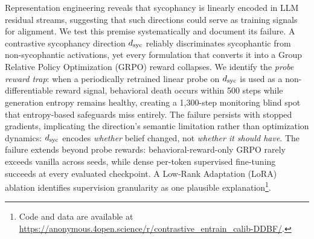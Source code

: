 Representation engineering reveals that sycophancy is linearly encoded in LLM residual streams, suggesting that such directions could serve as training signals for alignment. We test this premise systematically and document its failure. A contrastive sycophancy direction $d_{\text{syc}}$ reliably discriminates sycophantic from non-sycophantic activations, yet every formulation that converts it into a Group Relative Policy Optimization (GRPO) reward collapses. We identify the \emph{probe reward trap}: when a periodically retrained linear probe on $d_{\text{syc}}$ is used as a non-differentiable reward signal, behavioral death occurs within 500 steps while generation entropy remains healthy, creating a 1{,}300-step monitoring blind spot that entropy-based safeguards miss entirely. The failure persists with stopped gradients, implicating the direction's semantic limitation rather than optimization dynamics: $d_{\text{syc}}$ encodes \emph{whether} belief changed, not \emph{whether it should have}. The failure extends beyond probe rewards: behavioral-reward-only GRPO rarely exceeds vanilla across seeds, while dense per-token supervised fine-tuning succeeds at every evaluated checkpoint. A Low-Rank Adaptation (LoRA) ablation identifies supervision granularity as one plausible explanation\footnote{Code and data are available at \url{https://anonymous.4open.science/r/contrastive_entrain_calib-DDBF/}.}.
